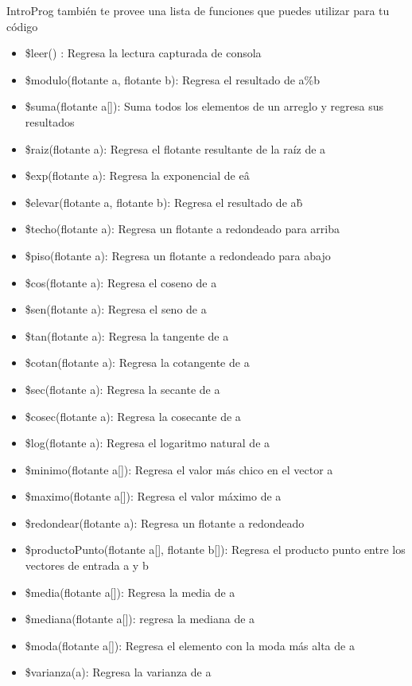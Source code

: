 IntroProg también te provee una lista de funciones que puedes utilizar para tu código
\begin{itemize}
    \item  \$leer() : Regresa la lectura capturada de consola
    \item  \$modulo(flotante a, flotante b): Regresa el resultado de a\%b
    \item  \$suma(flotante a[]): Suma todos los elementos de un arreglo y regresa sus resultados
    \item  \$raiz(flotante a): Regresa el flotante resultante de la raíz de a
    \item  \$exp(flotante a): Regresa la exponencial de e\^a
    \item  \$elevar(flotante a, flotante b): Regresa el resultado de a\^b
    \item  \$techo(flotante a): Regresa un flotante a redondeado para arriba
    \item  \$piso(flotante a): Regresa un flotante a redondeado para abajo
    \item  \$cos(flotante a): Regresa el coseno de a
    \item  \$sen(flotante a): Regresa el seno de a
    \item  \$tan(flotante a): Regresa la tangente de a
    \item  \$cotan(flotante a): Regresa la cotangente de a
    \item  \$sec(flotante a): Regresa la secante de a
    \item  \$cosec(flotante a): Regresa la cosecante de a
    \item  \$log(flotante a): Regresa el logaritmo natural de a
    \item  \$minimo(flotante a[]): Regresa el valor más chico en el vector a
    \item  \$maximo(flotante a[]): Regresa el valor máximo de a
    \item  \$redondear(flotante a): Regresa un flotante a redondeado
    \item  \$productoPunto(flotante a[], flotante b[]): Regresa el producto punto entre los vectores de entrada a y b
    \item  \$media(flotante a[]): Regresa la media de a
    \item  \$mediana(flotante a[]): regresa la mediana de a
    \item  \$moda(flotante a[]): Regresa el elemento con la moda más alta de a
    \item  \$varianza(a): Regresa la varianza de a

\end{itemize}
